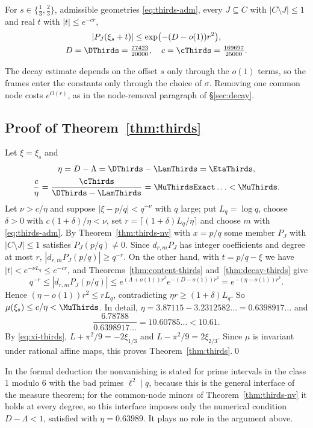 \begin{theorem}\label{thm:decay-thirds}
For $s\in\{\frac13,\frac23\}$, admissible geometries \eqref{eq:thirds-adm}, every $J\subseteq C$ with $|C\setminus J|\le1$ and real $t$ with
$|t|\le e^{-cr}$,
\[
\begin{gathered}
 |P_J(\xi_s+t)|\le\exp\bigl(-(D-o(1))r^2\bigr),\\
 D=\DThirds=\tfrac{77423}{20000},\quad c=\cThirds=\tfrac{169697}{25000}.
\end{gathered}
\]
\end{theorem}
The decay estimate depends on the offset $s$ only through the $o(1)$ terms, so the frames enter the constants only through the choice of $\sigma$. Removing one common node costs $e^{O(r)}$, as in the node-removal paragraph of \S\ref{sec:decay}.

\subsection{Proof of Theorem~\ref{thm:thirds}}
Let $\xi=\xi_s$ and
\[
\begin{gathered}
 \eta=D-\Lambda=\DThirds-\LamThirds=\EtaThirds,\\
 \frac c\eta=\frac{\cThirds}{\DThirds-\LamThirds}=\MuThirdsExact\ldots<\MuThirds .
\end{gathered}
\]
Let $\nu>c/\eta$ and suppose $|\xi-p/q|<q^{-\nu}$ with $q$ large; put $L_q=\log q$, choose $\delta>0$ with $c(1+\delta)/\eta<\nu$, set
$r=\lceil(1+\delta)L_q/\eta\rceil$ and choose $m$ with \eqref{eq:thirds-adm}. By Theorem~\ref{thm:thirds-nv} with $x=p/q$ some member $P_J$ with
$|C\setminus J|\le1$ satisfies $P_J(p/q)\ne0$. Since $d_{r,m}P_J$ has integer coefficients and degree at most $r$, $|d_{r,m}P_J(p/q)|\ge q^{-r}$. On the other hand, with
$t=p/q-\xi$ we have $|t|<e^{-\nu L_q}\le e^{-cr}$, and Theorems~\ref{thm:content-thirds} and~\ref{thm:decay-thirds} give
\[
 q^{-r}\le|d_{r,m}P_J(p/q)|\le e^{(\Lambda+o(1))r^2}e^{-(D-o(1))r^2}=e^{-(\eta-o(1))r^2}.
\]
Hence $(\eta-o(1))r^2\le rL_q$, contradicting $\eta r\ge(1+\delta)L_q$. So $\mu(\xi_s)\le c/\eta<\MuThirds$. In detail,
$\eta=3.87115-3.2312582\ldots=0.6398917\ldots$ and
\[
 \frac{6.78788}{0.6398917\ldots}=10.60785\ldots<10.61 .
\]
By \eqref{eq:xi-thirds}, $L+\pi^2/9=-2\xi_{1/3}$ and $L-\pi^2/9=2\xi_{2/3}$. Since $\mu$ is invariant under rational affine maps, this proves Theorem~\ref{thm:thirds}.\qed

\begin{remark}
In the formal deduction the nonvanishing is stated for prime intervals in the class $1$ modulo $6$ with the bad primes $\ell^2\mid q$, because this is the
general interface of the measure theorem; for the common-node minors of Theorem~\ref{thm:thirds-nv} it holds at every degree, so this interface imposes only the numerical
condition $D-\Lambda<1$, satisfied with $\eta=0.63989$. It plays no role in the argument above.
\end{remark}
